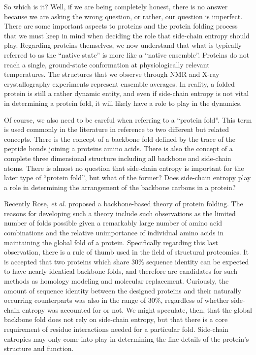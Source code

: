 So which is it? Well, if we are being completely honest, there is no answer because we are asking the wrong question, or rather, our question is imperfect. There are some important aspects to proteins and the protein folding process that we must keep in mind when deciding the role that side-chain entropy should play. Regarding proteins themselves, we now understand that what is typically referred to as the ``native state'' is more like a ``native ensemble''. Proteins do not reach a single, ground-state conformation at physiologically relevant temperatures. The structures that we observe through NMR and X-ray crystallography experiments represent ensemble averages. In reality, a folded protein is still a rather dynamic entity, and even if side-chain entropy is not vital in determining a protein fold, it will likely have a role to play in the dynamics.

Of course, we also need to be careful when referring to a ``protein fold''. This term is used commonly in the literature in reference to two different but related concepts. There is the concept of a backbone fold defined by the trace of the peptide bonds joining a proteins amino acids. There is also the concept of a complete three dimensional structure including all backbone and side-chain atoms. There is almost no question that side-chain entropy is important for the later type of ``protein fold'', but what of the former? Does side-chain entropy play a role in determining the arrangement of the backbone carbons in a protein?

Recently Rose, \emph{et al.} proposed a backbone-based theory of protein folding\cite{Rose:2006p362}. The reasons for developing such a theory include such observations as the limited number of folds possible given a remarkably large number of amino acid combinations and the relative unimportance of individual amino acids in maintaining the global fold of a protein. Specifically regarding this last observation, there is a rule of thumb used in the field of structural proteomics. It is accepted that two proteins which share 30\% sequence identity can be expected to have nearly identical backbone folds, and therefore are candidates for such methods as homology modeling and molecular replacement. Curiously, the amount of sequence identity between the designed proteins and their naturally occurring counterparts was also in the range of 30\%, regardless of whether side-chain entropy was accounted for or not. We might speculate, then, that the global backbone fold does not rely on side-chain entropy, but that there is a core requirement of residue interactions needed for a particular fold. Side-chain entropies may only come into play in determining the fine details of the protein's structure and function.
